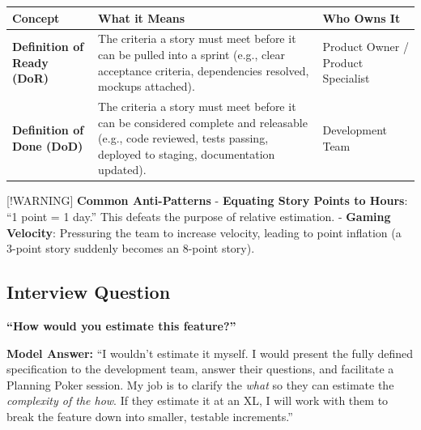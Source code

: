 \documentclass[
  11pt,
  openany,
  oneside]{book}
\renewenvironment{quote}{\begin{customquote}}{\end{customquote}}
\begin{document}
\begin{longtable}[]{@{}
  >{\raggedright\arraybackslash}p{}
  >{\raggedright\arraybackslash}p{}
  >{\raggedright\arraybackslash}p{}@{}}
\toprule\noalign{}
\begin{minipage}[b]{\linewidth}\raggedright
Concept
\end{minipage} & \begin{minipage}[b]{\linewidth}\raggedright
What it Means
\end{minipage} & \begin{minipage}[b]{\linewidth}\raggedright
Who Owns It
\end{minipage} \\
\midrule\noalign{}
\endhead
\bottomrule\noalign{}
\endlastfoot
\textbf{Definition of Ready (DoR)} & The criteria a story must meet
before it can be pulled into a sprint (e.g., clear acceptance criteria,
dependencies resolved, mockups attached). & Product Owner / Product
Specialist \\
\textbf{Definition of Done (DoD)} & The criteria a story must meet
before it can be considered complete and releasable (e.g., code
reviewed, tests passing, deployed to staging, documentation updated). &
Development Team \\
\end{longtable}

\begin{quote}
{[}!WARNING{]} \textbf{Common Anti-Patterns} - \textbf{Equating Story
Points to Hours}: ``1 point = 1 day.'' This defeats the purpose of
relative estimation. - \textbf{Gaming Velocity}: Pressuring the team to
increase velocity, leading to point inflation (a 3-point story suddenly
becomes an 8-point story).
\end{quote}

\subsection{Interview Question}\label{interview-question}

\textbf{``How would you estimate this feature?''}

\textbf{Model Answer:} ``I wouldn't estimate it myself. I would present
the fully defined specification to the development team, answer their
questions, and facilitate a Planning Poker session. My job is to clarify
the \emph{what} so they can estimate the \emph{complexity of the how}.
If they estimate it at an XL, I will work with them to break the feature
down into smaller, testable increments.''
\end{document}
